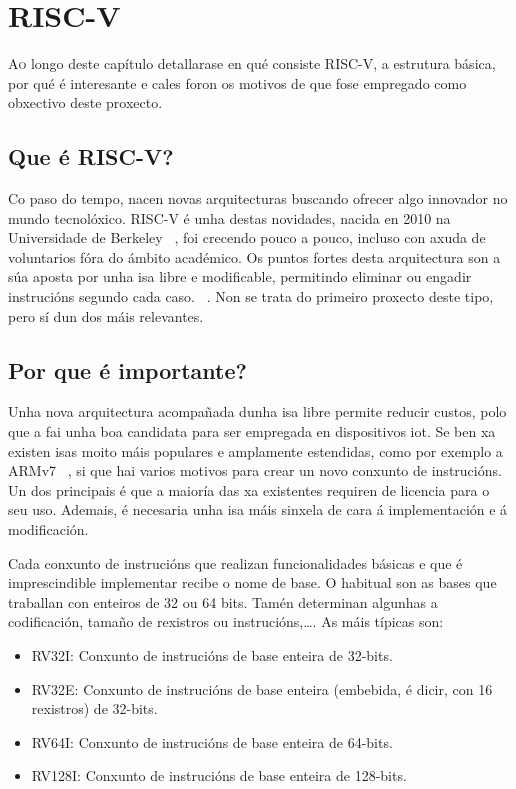 \chapter{RISC-V}
\label{chap:riscv}

\lettrine{A}{o} longo deste capítulo detallarase en qué consiste RISC-V, a estrutura básica, por qué é interesante e cales foron os motivos de que fose empregado como obxectivo deste proxecto.

\section{Que é RISC-V?}\label{sec:que_riscv}
Co paso do tempo, nacen novas arquitecturas buscando ofrecer algo innovador no mundo tecnolóxico. RISC-V é unha destas novidades, nacida en 2010 na Universidade de Berkeley ~\cite{WikipediaRISCV}, foi crecendo pouco a pouco, incluso con axuda de voluntarios fóra do ámbito académico. Os puntos fortes desta arquitectura son a súa aposta por unha \acrshort{isa} libre e modificable, permitindo eliminar ou engadir instrucións segundo cada caso. ~\cite{RISCV_IoT}. Non se trata do primeiro proxecto deste tipo, pero sí dun dos máis relevantes. 

\section{Por que é importante?}\label{sec:imp_riscv}
Unha nova arquitectura acompañada dunha \acrshort{isa} libre permite reducir custos, polo que a fai unha boa candidata para ser empregada en dispositivos \acrshort{iot}. Se ben xa existen \acrshort{isa}s moito máis populares e amplamente estendidas, como por exemplo a ARMv7 ~\cite{Waterman:EECS-2016-1}, si que hai varios motivos para crear un novo conxunto de instrucións. Un dos principais é que a maioría das xa existentes requiren de licencia para o seu uso. Ademais, é necesaria unha \acrshort{isa} máis sinxela de cara á implementación e á modificación. 

Cada conxunto de instrucións que realizan funcionalidades básicas e que é imprescindible implementar recibe o nome de base. O habitual son as bases que traballan con enteiros de 32 ou 64 \gls{bits}. Tamén determinan algunhas a codificación, tamaño de rexistros ou instrucións,\dots. As máis típicas son: 
\begin{itemize}
    \item RV32I: Conxunto de instrucións de base enteira de 32-bits.
    \item RV32E: Conxunto de instrucións de base enteira (embebida, é dicir, con 16 rexistros) de 32-bits.
    \item RV64I: Conxunto de instrucións de base enteira de 64-bits.
    \item RV128I: Conxunto de instrucións de base enteira de 128-bits.
\end{itemize}

